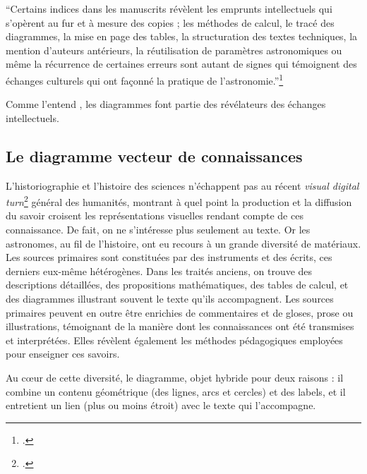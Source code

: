 \begin{kwote}
``Certains indices dans les manuscrits révèlent les emprunts
intellectuels qui s'opèrent au fur et à mesure des copies ; les méthodes
de calcul, le tracé des diagrammes, la mise en page des tables, la
structuration des textes techniques, la mention d'auteurs antérieurs, la
réutilisation de paramètres astronomiques ou même la récurrence de
certaines erreurs sont autant de signes qui témoignent des échanges
culturels qui ont façonné la pratique de l'astronomie.''\footcite[p.14]{albouy_mediation_2019}
\end{kwote}

Comme l'entend \citeauthor{albouy_mediation_2019}, les diagrammes font partie des révélateurs des
échanges intellectuels.

\hypertarget{le-diagramme-vecteur-de-connaissances}{%
\subsection{Le diagramme vecteur de
connaissances}\label{le-diagramme-vecteur-de-connaissances}}

L'historiographie et l'histoire des sciences n'échappent pas au récent \textit{visual digital turn}\footcite[``Digital humanities research has
  focused primarily on the analysis of texts. This emphasis stems from
  the availability of technology to study digitized text. Optical
  character recognition allows researchers to use keywords to search and
  analyze digitized texts. However, archives of digitized sources also
  contain large numbers of images.''][]{wevers_visual_2020} général des
humanités, montrant à quel point la production et la diffusion du savoir
croisent les représentations visuelles rendant compte de ces
connaissance. De fait, on ne s'intéresse plus seulement au texte. Or les
astronomes, au fil de l'histoire, ont eu recours à un grande diversité
de matériaux. Les sources primaires sont constituées par des instruments
et des écrits, ces derniers eux-même hétérogènes. Dans les traités
anciens, on trouve des descriptions détaillées, des propositions
mathématiques, des tables de calcul, et des diagrammes illustrant
souvent le texte qu'ils accompagnent. Les sources primaires peuvent en
outre être enrichies de commentaires et de gloses, prose ou
illustrations, témoignant de la manière dont les connaissances ont été
transmises et interprétées. Elles révèlent également les méthodes
pédagogiques employées pour enseigner ces savoirs.

Au cœur de cette diversité, le diagramme, objet hybride pour deux
raisons : il combine un contenu géométrique (des lignes, arcs et
cercles) et des labels, et il entretient un lien (plus ou moins étroit)
avec le texte qui l'accompagne.


